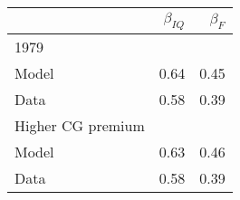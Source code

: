 \begin{tabular}{lrr}
\hline
  & $\beta_{IQ}$  & $\beta_{F}$  \\ 
\hline
1979 &   &   \\ 
Model & 0.64  & 0.45  \\ 
Data & 0.58  & 0.39  \\ 
Higher CG premium &   &   \\ 
Model & 0.63  & 0.46  \\ 
Data & 0.58  & 0.39  \\ 
\hline
\end{tabular}%

